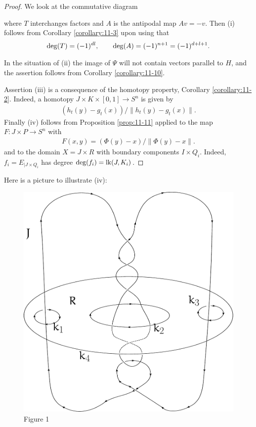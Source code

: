 \begin{proof}
  We look at the commutative diagram 
  \begin{center}
  \end{center}

  where $T$ interchanges factors and $A$ is the antipodal map $Av = -v$. Then (i)
  follows from Corollary \ref{corollary:11-3} upon using that
  \begin{align*}
    \mathrm{deg}(T) = (-1)^{dl}, \qquad \mathrm{deg}(A) = (-1)^{n+1} = (-1)^{d+l+1}.
  \end{align*}

  In the situation of (ii) the image of $\Psi$ will not contain vectors parallel to $H$, and
  the assertion follows from Corollary \ref{corollary:11-10}.

  Assertion (iii) is a consequence of the homotopy property, Corollary \ref{corollary:11-2}. Indeed,
  a homotopy $J\times K\times [0,1]\to S^n$ is given by
  \begin{align*}
    (h_t(y) -g_t(x))\big/ \|h_t(y) - g_t(x)\|.
  \end{align*}
  Finally (iv) follows from Proposition \ref{prop:11-11} applied to the map $F: J\times P\to S^n$ with
  \begin{align*}
    F(x, y) = (\Phi(y) - x)\big/ \|\Phi(y) - x\|.
  \end{align*}
  and to the domain $X=J\times R$ with boundary components $I\times Q_i$. Indeed, 
  $f_i = E_{|J\times Q_i}$ has degree $\mathrm{deg}(f_i) = \mathrm{lk}(J, K_i)$.
\end{proof}

Here is a picture to illustrate (iv):
\begin{figure}[!htb]
  \centering
  \includegraphics[width=.4\linewidth]{./pics/chap11-1-o.pdf} 
  \caption{Figure 1}
  \label{fig:11-1}
\end{figure}

